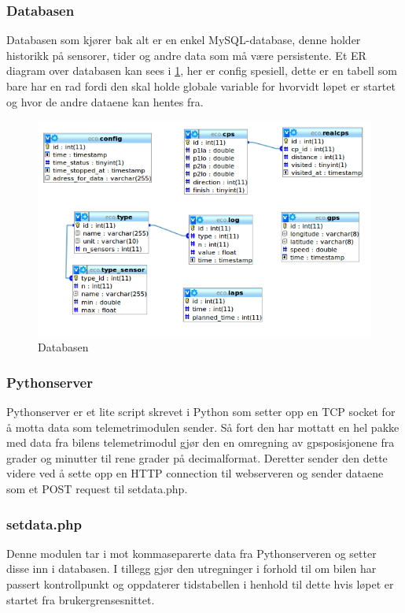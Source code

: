 \subsubsection{Databasen}
Databasen som kjører bak alt er en enkel MySQL-database, denne holder historikk på sensorer, tider og andre data som må være persistente. Et ER diagram over databasen kan sees i \ref{er}, her er config spesiell, dette er en tabell som bare har en rad fordi den skal holde globale variable for hvorvidt løpet er startet og hvor de andre dataene kan hentes fra.
\begin{figure}[H]
\label{er}
\includegraphics[width=\textwidth]{images/er.png}
\caption{Databasen} 
\end{figure}

\subsubsection{Pythonserver}
Pythonserver er et lite script skrevet i Python som setter opp en TCP socket for å motta data som telemetrimodulen sender. Så fort den har mottatt en hel pakke med data fra bilens telemetrimodul gjør den en omregning av gpsposisjonene fra grader og minutter til rene grader på decimalformat. Deretter sender den dette videre ved å sette opp en HTTP connection til webserveren og sender dataene som et POST request til setdata.php.
\subsubsection{setdata.php}
Denne modulen tar i mot kommaseparerte data fra Pythonserveren og setter disse inn i databasen. I tillegg gjør den utregninger i forhold til om bilen har passert kontrollpunkt og oppdaterer tidstabellen i henhold til dette hvis løpet er startet fra brukergrensesnittet.
